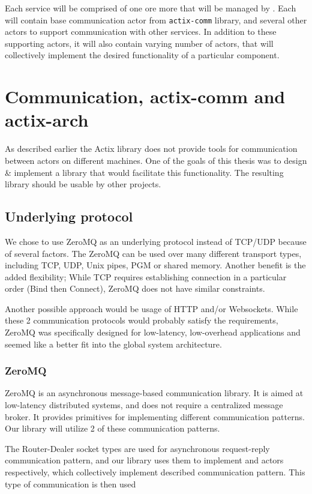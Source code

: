 Each service will be comprised of one ore more  that will be managed by . Each 
will contain base communication actor from \verb|actix-comm| library, and several other actors to support communication with other services. In addition to
these supporting actors, it will also contain varying number of actors, that will collectively implement
the desired functionality of a particular component.

\section{Communication, actix-comm and actix-arch}
\label{section:actix_comm}
As described earlier the Actix library does not provide tools for communication between actors on different machines. One of the
goals of this thesis was to design \& implement a library that would facilitate this functionality. The resulting library
should be usable by other projects.

\subsection{Underlying protocol}
We chose to use ZeroMQ\cite{hintjens2011} as an underlying protocol instead of TCP/UDP because of several factors. The ZeroMQ can be used over
many different transport types, including TCP, UDP, Unix pipes, PGM or shared memory. Another benefit is the added flexibility; While
TCP requires establishing connection in a particular order (Bind then Connect), ZeroMQ does not have similar constraints.

Another possible approach would be usage of HTTP and/or Websockets. While these 2 communication protocols would probably
satisfy the requirements, ZeroMQ was specifically designed for low-latency, low-overhead applications and seemed
like a better fit into the global system architecture.

\subsubsection{ZeroMQ}
ZeroMQ is an asynchronous message-based communication library. It is aimed at low-latency distributed systems, and does not require a centralized
message broker. It provides primitives for implementing different communication patterns. Our library
will utilize 2 of these communication patterns.

The Router-Dealer socket types are used for asynchronous request-reply communication pattern, and our library uses
them to implement  and  actors respectively, which collectively implement described communication pattern.
This type of communication is then used

